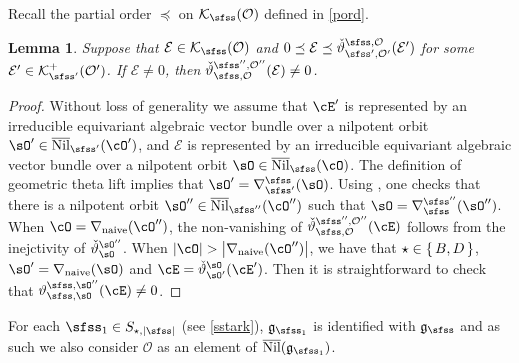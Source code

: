\documentclass[11pt,a4paper]{amsart}
\def\abs#1{\left|{#1}\right|}
\newcommand{\CE}{{\mathcal {E}}}
\newcommand{\CK}{{\mathcal {K}}}
\newcommand{\CO}{{\mathcal {O}}}
\newcommand{\g}{\mathfrak g}
\def\DD{\nabla}
\numberwithin{equation}{section}
\newtheorem{lem}[thm]{Lemma}
\theoremstyle{remark}
\def\Nil{\overline{\mathrm{Nil}}}
\def\DDn{\DD_{\mathrm{naive}}}
\begin{document}
Recall the partial order  $\preceq $ on $ \CK_\sfss(\CO)$ defined in  \eqref{pord}.

\begin{lem}\label{lem74}
Suppose that $\CE\in \CK_{\sfss}(\CO)$ and $0\preceq \CE\preceq \check \vartheta_{\sfss', \CO'}^{\sfss, \CO}(\CE')$ for some $\CE'\in \CK^+_{\sfss'}(\CO')$. If $\CE\neq 0$, then  $\check \vartheta_{\sfss, \CO}^{\sfss'', \CO''}(\CE)\neq 0$.
\end{lem}
\begin{proof}
  Without loss of generality we assume that $\cE'$ is represented by an irreducible equivariant algebraic vector bundle over a nilpotent orbit $\sO'\in \Nil_{\sfss'}(\cO')$, and $\CE$ is represented by an irreducible equivariant algebraic vector bundle over a nilpotent orbit $\sO\in \Nil_{\sfss}(\cO)$.
  The definition of geometric theta lift implies that $\sO'=\DDss(\sO)$. Using ,
  one checks that there is a nilpotent orbit $\sO''\in \Nil_{\sfss''}(\cO'')$ such that
  $\sO = \DD_{\sfss}^{\sfss''}(\sO'')$.
  When $\cO = \DDn(\cO'')$, the non-vanishing of $\check \vartheta_{\sfss, \CO}^{\sfss'', \CO''}(\cE)$
  follows from the inejctivity of $\dlift_{\sO}^{\sO''}$.
  When $\abs{\cO} > \abs{\DDn(\cO'')}$, we have that $\star \in \set{B,D}$, $\sO'=\DDn(\sO)$
  and  $\cE = \dlift_{\sO'}^{\sO}(\cE')$.
  Then it is straightforward to check that $\vartheta_{\sfss,\sO}^{\sfss,\sO''}(\cE) \neq 0$.
\end{proof}


For each $\sfss_1\in S_{\star, \abs{\sfss}}$ (see \eqref{sstark}),  $\g_{\sfss_1}$ is identified with $\g_{\sfss}$ and as such we also consider $\CO$ as an element of $\Nil(\g_{\sfss_1})$.
\end{document}
